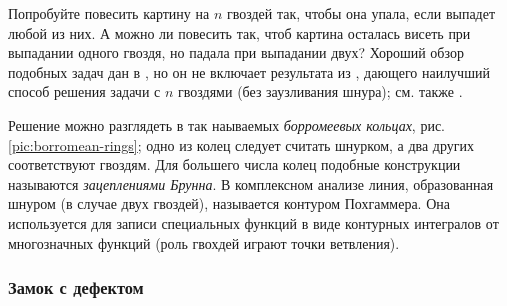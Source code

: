 \begin{addedbytheeditors}
Попробуйте повесить картину на $n$ гвоздей так, чтобы она упала, если выпадет любой из них.
А можно ли повесить так, чтоб картина осталась висеть при выпадании одного гвоздя, но падала при выпадании двух?
Хороший обзор подобных задач дан в \cite{demaine2014}, но он не включает результата из \cite{gartside-greenwood}, дающего наилучший способ решения задачи с $n$ гвоздями (без заузливания шнура); см. также \cite{epifanov}.

Решение можно разглядеть в так наываемых \emph{борромеевых кольцах}, рис. \ref{pic:borromean-rings};
одно из колец следует считать шнурком, а два других соответствуют гвоздям.
Для большего числа колец подобные конструкции называются \emph{зацеплениями Брунна}.
В комплексном анализе линия, образованная шнуром (в случае двух гвоздей), называется контуром Похгаммера. Она используется для записи специальных функций в виде контурных интегралов от многозначных функций (роль гвохдей играют точки ветвления).
\pr
\end{addedbytheeditors}

\subsubsection*{Замок с дефектом}

